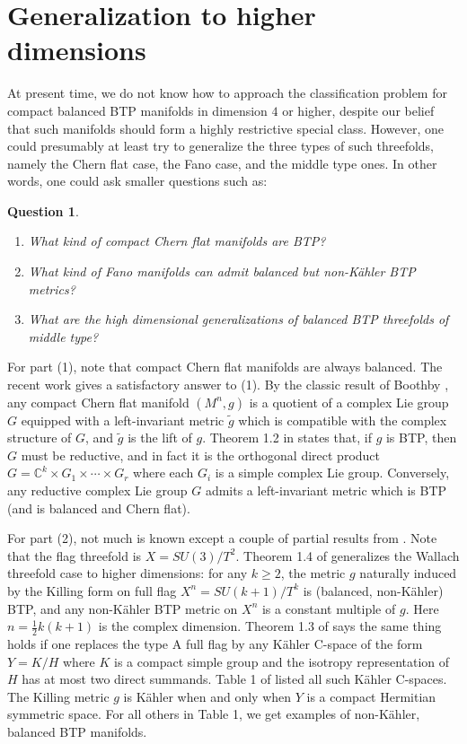 \documentclass{amsart}
\numberwithin{equation}{section}
\newtheorem{question}  [theorem]     {Question}
\theoremstyle{definition}
\renewcommand{\1}{\mathds{1}}
\renewcommand{\>}{\rightarrow}
\begin{document}
\vspace{0.4cm}

\section{Generalization to higher dimensions}\label{highD}

At present time, we do not know how to approach the classification problem for compact balanced BTP manifolds in dimension $4$ or higher, despite our belief that such manifolds should form a highly restrictive special class.  However, one could presumably  at least try to generalize the three types of such threefolds, namely the Chern flat case, the Fano case, and the middle type ones. In other words, one could ask smaller questions such as:

\begin{question}\begin{enumerate}
\item What kind of compact Chern flat manifolds  are  BTP?
\item What kind of Fano manifolds can admit balanced but non-K\"ahler BTP metrics?
\item What are the high dimensional generalizations of balanced BTP threefolds of middle type?
\end{enumerate}
\end{question}

For part (1), note that compact Chern flat manifolds are always balanced. The recent work \cite{PodestaZ} gives a satisfactory  answer to (1). By the classic result of Boothby \cite{Boothby}, any compact Chern flat manifold $(M^n,g)$ is a quotient of a complex Lie group $G$ equipped with a left-invariant metric $\tilde{g}$ which is compatible with the complex structure of $G$, and $\tilde{g}$ is the lift of  $g$.  Theorem 1.2 in \cite{PodestaZ} states that, if $g$ is BTP, then $G$ must be reductive, and in fact it is the orthogonal direct product
$ G={\mathbb C}^k \times G_1 \times \cdots \times G_r$
where each $G_i$ is a simple complex Lie group. Conversely,  any reductive complex Lie group $G$ admits a left-invariant metric which is BTP (and is balanced and Chern flat).

For part (2), not much is known except a couple of partial results from \cite{PodestaZ}.  Note that the flag threefold is $X=SU(3)/T^2$. Theorem 1.4 of \cite{PodestaZ} generalizes the Wallach threefold case to higher dimensions: for any $k\geq 2$, the metric $g$ naturally induced by the Killing form on full flag $X^n = SU(k+1)/T^k$ is (balanced, non-K\"ahler) BTP, and any non-K\"ahler BTP metric on $X^n$ is a constant multiple of $g$. Here $n=\frac{1}{2}k(k+1)$ is the complex dimension. Theorem 1.3 of \cite{PodestaZ} says the same thing holds if one replaces the type A full flag by any K\"ahler C-space of the form $Y=K/H$ where $K$ is a compact simple group and the isotropy representation of $H$ has at most two direct summands. Table 1 of \cite{PodestaZ} listed all such K\"ahler C-spaces. The Killing metric $g$ is K\"ahler when and only when $Y$ is a compact Hermitian symmetric space. For all others in Table 1, we get examples of non-K\"ahler, balanced BTP manifolds.
\end{document}
